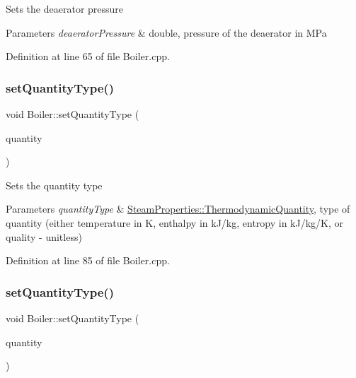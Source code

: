 Sets the deaerator pressure 
\begin{DoxyParams}{Parameters}
{\em deaerator\+Pressure} & double, pressure of the deaerator in M\+Pa \\
\hline
\end{DoxyParams}


Definition at line 65 of file Boiler.\+cpp.

\mbox{\label{class_boiler_a9c5b20cae6133c9174b12760f36d52c2}} 
\subsubsection{\texorpdfstring{set\+Quantity\+Type()}{setQuantityType()}\hspace{0.1cm}{\footnotesize\ttfamily [1/3]}}
{\footnotesize\ttfamily void Boiler\+::set\+Quantity\+Type (\begin{DoxyParamCaption}\item[{\hyperlink{class_steam_properties_ae0294bedf7d178c2d8fb6aed0f62fbff}{Steam\+Properties\+::\+Thermodynamic\+Quantity}}]{quantity }\end{DoxyParamCaption})}

Sets the quantity type 
\begin{DoxyParams}{Parameters}
{\em quantity\+Type} & \hyperlink{class_steam_properties_ae0294bedf7d178c2d8fb6aed0f62fbff}{Steam\+Properties\+::\+Thermodynamic\+Quantity}, type of quantity (either temperature in K, enthalpy in k\+J/kg, entropy in k\+J/kg/K, or quality -\/ unitless) \\
\hline
\end{DoxyParams}


Definition at line 85 of file Boiler.\+cpp.

\mbox{\label{class_boiler_a9c5b20cae6133c9174b12760f36d52c2}} 
\subsubsection{\texorpdfstring{set\+Quantity\+Type()}{setQuantityType()}\hspace{0.1cm}{\footnotesize\ttfamily [2/3]}}
{\footnotesize\ttfamily void Boiler\+::set\+Quantity\+Type (\begin{DoxyParamCaption}\item[{\hyperlink{class_steam_properties_ae0294bedf7d178c2d8fb6aed0f62fbff}{Steam\+Properties\+::\+Thermodynamic\+Quantity}}]{quantity }\end{DoxyParamCaption})}

